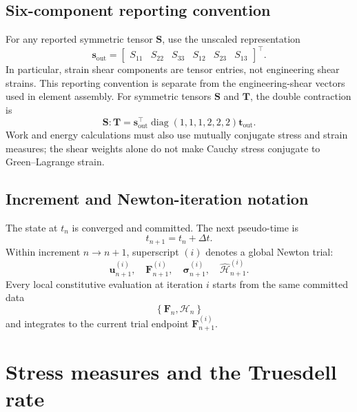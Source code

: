 \documentclass[11pt,a4paper]{article}
\newcommand{\bs}[1]{\boldsymbol{#1}}
\newcommand{\F}{\bs{F}}
\newcommand{\sig}{\bs{\sigma}}
\newcommand{\vct}[1]{\mathbf{#1}}
\begin{document}
\subsection{Six-component reporting convention}

For any reported symmetric tensor $\bs S$, use the unscaled representation
\begin{equation}
\vct s_{\mathrm{out}}=
\begin{bmatrix}S_{11}&S_{22}&S_{33}&S_{12}&S_{23}&S_{13}\end{bmatrix}^{\top}.
\label{eq:output-six-components}
\end{equation}
In particular, strain shear components are tensor entries, not engineering shear strains.
This reporting convention is separate from the engineering-shear vectors used in element assembly.
For symmetric tensors $\bs S$ and $\bs T$, the double contraction is
\begin{equation}
\bs S:\bs T=\vct s_{\mathrm{out}}^\top
\operatorname{diag}(1,1,1,2,2,2)\vct t_{\mathrm{out}}.
\end{equation}
Work and energy calculations must also use mutually conjugate stress and strain measures;
the shear weights alone do not make Cauchy stress conjugate to Green--Lagrange strain.

\subsection{Increment and Newton-iteration notation}

The state at $t_n$ is converged and committed. The next pseudo-time is
\begin{equation}
t_{n+1}=t_n+\Delta t.
\end{equation}
Within increment $n\rightarrow n+1$, superscript $(i)$ denotes a global Newton trial:
\begin{equation}
\bs{u}_{n+1}^{(i)},\quad
\F_{n+1}^{(i)},\quad
\sig_{n+1}^{(i)},\quad
\widehat{\mathcal H}_{n+1}^{(i)}.
\end{equation}
Every local constitutive evaluation at iteration $i$ starts from the same committed data
\begin{equation}
\left\{\F_n,\mathcal H_n\right\}
\end{equation}
and integrates to the current trial endpoint $\F_{n+1}^{(i)}$.

\section{Stress measures and the Truesdell rate}
\end{document}
